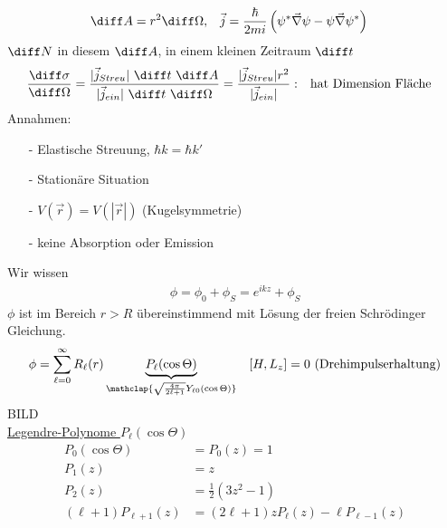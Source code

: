 		\begin{align*}
			\diff A &= r^2 \diff \Omega ,& 
			\vec{j} &= \frac{\hbar}{2 m i} \left(\psi^* \vec{\nabla} \psi - \psi \vec{\nabla} \psi^* \right)
		\end{align*}
	$\diff N$ in diesem $\diff A$, in einem kleinen Zeitraum $\diff t$ 
		\begin{align*}
			\frac{\diff \sigma}{\diff \Omega}
			&= \frac{|\vec{j}_{Streu}| ~\diff t ~ \diff A}{ |\vec{j}_{ein}| ~\diff t ~ \diff \Omega}
			=\frac{|\vec{j}_{Streu}| r^2}{|\vec{j}_{ein}|} :&
			&\text{hat Dimension Fläche}
		\end{align*}
	Annahmen:
		\begin{itemize}
			\item[-] 	Elastische Streuung, $\hbar k = \hbar k'$
			\item[-]	Stationäre Situation
			\item[-]	$V(\vec{r}) = V(|\vec{r}|)$ (Kugelsymmetrie)
			\item[-]	keine Absorption oder Emission
		\end{itemize}
	Wir wissen
		\begin{align*}
			\phi = \phi_0 + \phi_S = e^{i k z} + \phi_S
		\end{align*}
	$\phi$ ist im Bereich $r>R$ übereinstimmend mit Lösung der freien Schrödinger Gleichung.
		\begin{align*}
			\phi = \sum_{\ell = 0}^{\infty} R_\ell (r) 
			\underbrace{P_\ell (\cos \Theta)}_{\mathclap{\sqrt{\frac{4 \pi}{2\ell+1}} 
					Y_{\ell 0}(\cos \Theta)}} 
			& &[H, L_z] = 0 ~(\text{Drehimpulserhaltung})
		\end{align*}
	BILD \\
	\underline{Legendre-Polynome $P_\ell (\cos \Theta)$}
		\begin{align*}
			P_0 (\cos \Theta) &= P_0 (z) = 1\\
			P_1 (z) &= z \\
			P_2 (z) &= \frac{1}{2} (3z^2-1) \\
			(\ell + 1) P_{\ell + 1} (z) &= (2 \ell + 1) z P_\ell (z) - \ell P_{\ell - 1} (z)
		\end{align*}